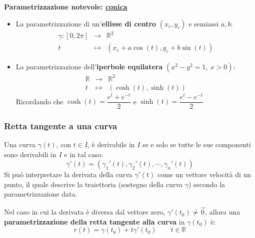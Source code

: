 \documentclass[a4paper]{article}
\newcommand{\definition}[1]{\textcolor{Red3}{\textbf{#1}}}
\begin{document}
	\begin{flushleft}
		\definition{Parametrizzazione notevole: \underline{conica}}
	\end{flushleft}
	\begin{itemize}
		\item La parametrizzazione di un'\textbf{ellisse di centro} $\left(x_{c}, y_{c}\right)$ e semiassi $a,b$:
		\begin{equation*}
			\begin{array}{rcl}
				\gamma:\left[0,2\pi\right] &\rightarrow& \mathbb{R}^{2} \\
				t &\mapsto& \left(x_{c} + a \cos\left(t\right), y_{c} + b \sin\left(t\right)\right)
			\end{array}
		\end{equation*}

		\item La parametrizzazione dell'\textbf{iperbole equilatera} $\left(x^{2}-y^{2} = 1, \: x > 0\right)$:
		\begin{equation*}
			\begin{array}{rcl}
				\mathbb{R} &\rightarrow& \mathbb{R}^{2} \\
				t &\mapsto& \left(\cosh\left(t\right), \sinh\left(t\right)\right)
			\end{array}
		\end{equation*}
		Ricordando che $\cosh\left(t\right) = \dfrac{e^{t} + e^{-t}}{2}$ e $\sinh\left(t\right) = \dfrac{e^{t} - e^{-t}}{2}$
	\end{itemize}\newpage

	\subsubsection{Retta tangente a una curva}\label{subsubsection: retta tangente a una curva}

	Una curva $\gamma\left(t\right)$, con $t \in I$, è derivabile in $I$ se e solo se tutte le sue componenti sono derivabili in $I$ e in tal caso:
	\begin{equation*}
		\gamma'\left(t\right) = \left(\gamma_{1}'\left(t\right), \gamma_{2}'\left(t\right), \cdots, \gamma_{n}'\left(t\right)\right)
	\end{equation*}
	Si può interpretare la derivata della curva $\gamma'\left(t\right)$ come un vettore velocità di un punto, il quale descrive la traiettoria (sostegno della curva $\gamma$) secondo la parametrizzazione data.

	Nel caso in cui la derivata è diversa dal vettore zero, $\gamma'\left(t_{0}\right) \ne \overrightarrow{0}$, allora una \definition{parametrizzazione della retta tangente alla curva} in $\gamma\left(t_{0}\right)$ è:
	\begin{equation}\label{eq: parametrizzazione della retta tangente alla curva}
		r\left(t\right) = \gamma\left(t_{0}\right) + t\gamma'\left(t_{0}\right) \hspace{2em} t \in \mathbb{R}
	\end{equation}
\end{document}
